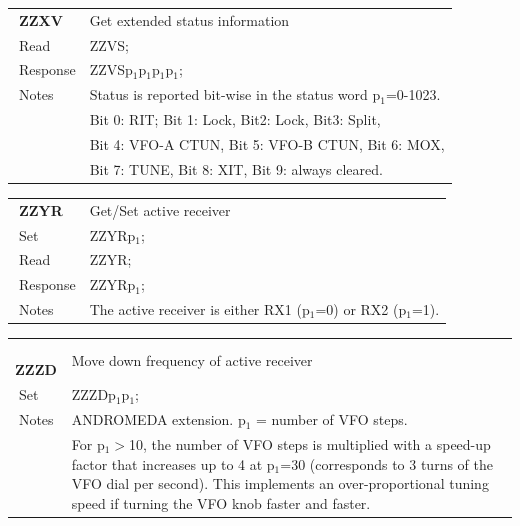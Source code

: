 \documentclass[12pt]{book}
\begin{document}
\begin{center}
\begin{tabular}{|p{2cm}|p{11cm}|}
\toprule
$\phantom{\Big|}$\textbf{\large ZZXV} & Get extended status information \\\cline{1-2}
$\phantom{\Big|}${\large Read} & {ZZVS;} \\\hline
$\phantom{\Big|}${\large Response} & {ZZVSp$_1$p$_1$p$_1$p$_1$;} \\\hline
$\phantom{\Big|}${\large Notes} & \multicolumn{1}{|p{11cm}|}{Status is reported bit-wise in the status word p$_1$=0-1023.} \\
 & \multicolumn{1}{|p{11cm}|}{Bit 0: RIT; Bit 1: Lock, Bit2: Lock, Bit3: Split,} \\
 & \multicolumn{1}{|p{11cm}|}{Bit 4: VFO-A CTUN, Bit 5: VFO-B CTUN, Bit 6: MOX,} \\
 & \multicolumn{1}{|p{11cm}|}{Bit 7: TUNE, Bit 8: XIT, Bit 9: always cleared.} \\
\bottomrule
\end{tabular}
\end{center}

\begin{center}
\begin{tabular}{|p{2cm}|p{11cm}|}
\toprule
$\phantom{\Big|}$\textbf{\large ZZYR} & Get/Set active receiver \\\cline{1-2}
$\phantom{\Big|}${\large Set} & {ZZYRp$_1$;} \\\hline
$\phantom{\Big|}${\large Read} & {ZZYR;} \\\hline
$\phantom{\Big|}${\large Response} & {ZZYRp$_1$;} \\\hline
$\phantom{\Big|}${\large Notes} & \multicolumn{1}{|p{11cm}|}{The active receiver is either RX1 (p$_1$=0) or RX2 (p$_1$=1).} \\
\bottomrule
\end{tabular}
\end{center}

\begin{center}
\begin{tabular}{|p{2cm}|p{11cm}|}
\toprule
$\phantom{\Big|}$\textbf{\large ZZZD} & Move down frequency of active receiver \\\cline{1-2}
$\phantom{\Big|}${\large Set} & {ZZZDp$_1$p$_1$;} \\\hline
$\phantom{\Big|}${\large Notes} & \multicolumn{1}{|p{11cm}|}{ANDROMEDA extension. p$_1$ = number of VFO steps.} \\
 & \multicolumn{1}{|p{11cm}|}{For p$_1$$>$10, the number of VFO steps is multiplied with a speed-up factor that increases up to 4 at p$_1$=30 (corresponds to 3 turns of the VFO dial per second). This implements an over-proportional tuning speed if turning the VFO knob faster and faster.} \\
\bottomrule
\end{tabular}
\end{center}
\end{document}
